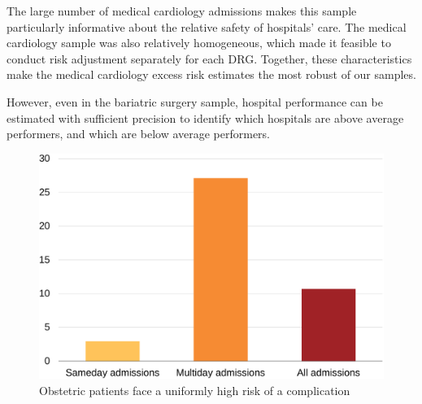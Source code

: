 \documentclass[submission]{grattan}
\begin{document}
The large number of medical cardiology admissions makes this sample particularly informative about the relative safety of hospitals' care.
The medical cardiology sample was also relatively homogeneous, which made it feasible to conduct risk adjustment separately for each DRG\@.
Together, these characteristics make the medical cardiology excess risk estimates the most robust of our samples.\pagebreak[3]

However, even in the bariatric surgery sample, hospital performance can be estimated with sufficient precision to identify which hospitals are above average performers, and which are below average performers.

\begin{figure}[!t]
\caption{Obstetric patients face a uniformly high risk of a complication}\label{fig:obstetric-patients-face-uniformly-high-risk-of-complication}
\includegraphics[page=29]{atlas/comps_charts.pdf}
\end{figure}
\end{document}
